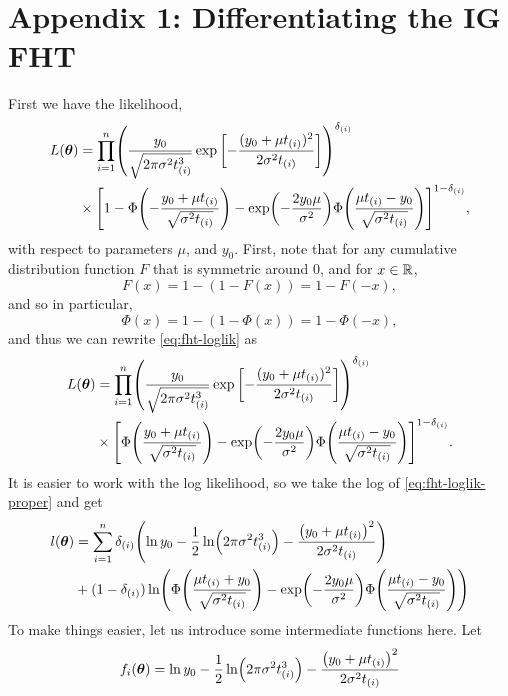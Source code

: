 \chapter{Appendix 1: Differentiating the IG FHT}
First we have the likelihood,
\begin{align}\label{eq:fht-loglik}
\begin{split}
L(\btheta)&=\prod_{i=1}^n\p*{\frac{y_0}{\sqrt{2\pi\sigma^2\ti^3}}\exp\left[-\frac{(y_0+\mu \ti)^2}{2\sigma^2\ti}\right]}^{\di}\\
&\times\sqb*{1-\Phi\p*{-\frac{y_0+\mu \ti}{\sqrt{\sigma^2\ti}}}-\exp\p*{-\frac{2y_0\mu}{\sigma^2}}\Phi\p*{\frac{\mu \ti-y_0}{\sqrt{\sigma^2\ti}}}}^{1-\di},
\end{split}
\end{align}
with respect to parameters $\mu$, and $y_0$. First, note that for any cumulative distribution function $F$ that is symmetric around 0, and for $x\in\mathbb{R}$,
\begin{equation}
    F(x)=1-(1-F(x))=1-F(-x),
\end{equation}
and so in particular,
\begin{equation}
    \Phi(x)=1-(1-\Phi(x))=1-\Phi(-x),
\end{equation}
and thus we can rewrite \eqref{eq:fht-loglik} as
\begin{align}\label{eq:fht-loglik-proper}
\begin{split}
L(\btheta)&=\prod_{i=1}^n\p*{\frac{y_0}{\sqrt{2\pi\sigma^2\ti^3}}\exp\left[-\frac{(y_0+\mu \ti)^2}{2\sigma^2\ti}\right]}^{\di}\\
&\times\sqb*{\Phi\p*{\frac{y_0+\mu \ti}{\sqrt{\sigma^2\ti}}}-\exp\p*{-\frac{2y_0\mu}{\sigma^2}}\Phi\p*{\frac{\mu \ti-y_0}{\sqrt{\sigma^2\ti}}}}^{1-\di}.
\end{split}
\end{align}
It is easier to work with the log likelihood, so we take the log of \eqref{eq:fht-loglik-proper} and get
\begin{align}
\begin{split}
    l(\btheta)&=\sum_{i=1}^n\di\p*{\ln y_0-\frac{1}{2}\ln\p*{2\pi\sigma^2\ti^3}-\frac{\p*{y_0+\mu\ti}^2}{2\sigma^2\ti}} \\
    &+
    (1-\di)\ln\p*{\Phi\p*{\frac{\mu\ti+y_0}{\sqrt{\sigma^2\ti}}}-\exp\p*{-\frac{2y_0\mu}{\sigma^2}}\Phi\p*{\frac{\mu\ti-y_0}{\sqrt{\sigma^2\ti}}}}
\end{split}
\end{align}
To make things easier, let us introduce some intermediate functions here. Let
\begin{equation}
f_i(\btheta)=\ln y_0-\frac{1}{2}\ln\p*{2\pi\sigma^2\ti^3}-\frac{\p*{y_0+\mu\ti}^2}{2\sigma^2\ti}
\end{equation}
